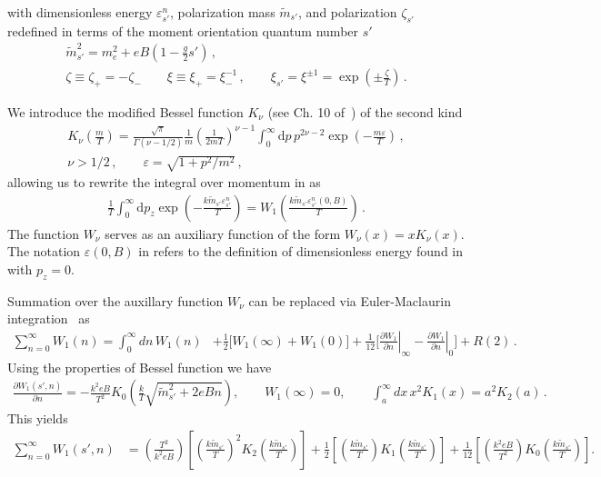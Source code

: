 with dimensionless energy $\varepsilon_{s'}^{n}$, polarization mass $\tilde{m}_{s'}$, and polarization $\zeta_{s'}$ redefined in terms of the moment orientation quantum number $s'$
\begin{gather}
 {\tilde m}_{s'}^{2}=m_{e}^{2}+e{B}\left(1-\frac{g}{2}s'\right)\,,\\
 \zeta\equiv\zeta_{+}=-\zeta_{-}\qquad\xi\equiv\xi_{+}=\xi_{-}^{-1}\,,\qquad\xi_{s'}=\xi^{\pm1}=\exp\left(\pm\frac{\zeta}{T}\right)\,.
\end{gather}

We introduce the modified Bessel function $K_{\nu}$ (see Ch. 10 of~\cite{Letessier:2002ony}) of the second kind
\begin{gather}
\label{besselk}
K_{\nu}\left(\frac{m}{T}\right)=\frac{\sqrt{\pi}}{\Gamma(\nu-1/2)}\frac{1}{m}\left(\frac{1}{2mT}\right)^{\nu-1}
\int_{0}^{\infty}\mathrm{d}p\,p^{2\nu-2}\exp\left({-\frac{m\varepsilon}{T}}\right)\,,\\
\nu>1/2\,,\qquad\varepsilon=\sqrt{1+p^{2}/m^{2}}\,,
\end{gather}
allowing us to rewrite the integral over momentum in  as
\begin{align}
 \label{besselkint}
 \frac{1}{T}\int_{0}^{\infty}\!\!\mathrm{d}p_{z}\exp\!\left(\!{-\frac{k{\tilde m}_{s'}\varepsilon_{s'}^{n}}{T}}\!\right)\!=\!W_{1}\!\!\left(\frac{k{\tilde m}_{s'}\varepsilon_{s'}^{n}(0,{B})}{T}\right)\,.
\end{align}
The function $W_{\nu}$ serves as an auxiliary function of the form $W_{\nu}(x)=xK_{\nu}(x)$. The notation $\varepsilon(0,{B})$ in  refers to the definition of dimensionless energy found in  with $p_{z}=0$.

Summation over the auxillary function $W_{\nu}$ can be replaced via Euler-Maclaurin integration~ as
\begin{align}
\sum^{\infty}_{n=0}W_1(n)=\int^\infty_0\!\!dn\,W_1(n)&+\frac{1}{2}\bigg[W_1(\infty)+W_1(0)\bigg]
+\frac{1}{12}\bigg[\left.\frac{\partial W_1}{\partial n}\right|_{\infty}-\left.\frac{\partial W_1}{\partial n}\right|_{0}\bigg]+R(2)\,.
\end{align}
Using the properties of Bessel function we have
\begin{align}
\frac{\partial W_1(s',n)}{\partial n}=-\frac{k^2eB}{T^2}K_0\left({\frac{k}{T}\sqrt{\tilde{m}^2_{s'}+2eBn}}\right),\qquad W_1(\infty)=0,\qquad
\int^\infty_a\!\!dx\,x^2K_1(x)=a^2K_2(a)\,.
\end{align}
This yields
\begin{align}
 \sum^{\infty}_{n=0}W_1(s',n)
 &=\left(\frac{T^2}{k^2eB}\right)\left[\left(\frac{k\tilde{m}_{s'}}{T}\right)^2K_2\left(\frac{k\tilde m_{s'}}{T}\right)\right]+\frac{1}{2}\left[\left(\frac{k\tilde{m}_{s'}}{T}\right)K_1\left(\frac{k\tilde m_{s'}}{T}\right)\right]
 +\frac{1}{12}\left[\left(\frac{k^2eB}{T^2}\right)K_0\left(\frac{k\tilde m_{s'}}{T}\right)\right].
\end{align}

